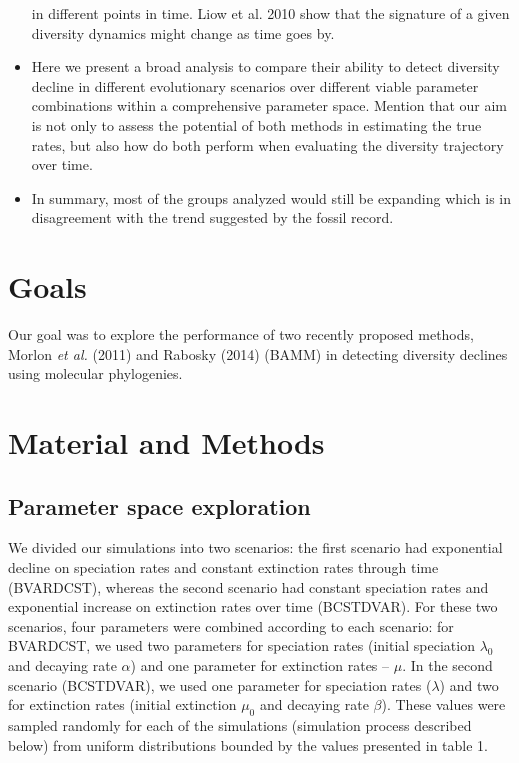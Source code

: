 \documentclass[12pt,]{article}
\begin{document}
\begin{itemize}
  in different points in time. Liow et al. 2010 show that the signature
  of a given diversity dynamics might change as time goes by.
\item
  Here we present a broad analysis to compare their ability to detect
  diversity decline in different evolutionary scenarios over different
  viable parameter combinations within a comprehensive parameter space.
  Mention that our aim is not only to assess the potential of both
  methods in estimating the true rates, but also how do both perform
  when evaluating the diversity trajectory over time.
\item
  In summary, most of the groups analyzed would still be expanding which
  is in disagreement with the trend suggested by the fossil record.
\end{itemize}

\section{Goals}\label{goals}

Our goal was to explore the performance of two recently proposed
methods, Morlon \emph{et al.} (2011) and Rabosky (2014) (BAMM) in
detecting diversity declines using molecular phylogenies.

\section{Material and Methods}\label{material-and-methods}

\subsection{Parameter space
exploration}\label{parameter-space-exploration}

We divided our simulations into two scenarios: the first scenario had
exponential decline on speciation rates and constant extinction rates
through time (BVARDCST), whereas the second scenario had constant
speciation rates and exponential increase on extinction rates over time
(BCSTDVAR). For these two scenarios, four parameters were combined
according to each scenario: for BVARDCST, we used two parameters for
speciation rates (initial speciation \(\lambda_0\) and decaying rate
\(\alpha\)) and one parameter for extinction rates -- \(\mu\). In the
second scenario (BCSTDVAR), we used one parameter for speciation rates
(\(\lambda\)) and two for extinction rates (initial extinction \(\mu_0\)
and decaying rate \(\beta\)). These values were sampled randomly for
each of the simulations (simulation process described below) from
uniform distributions bounded by the values presented in table 1.
\end{document}
